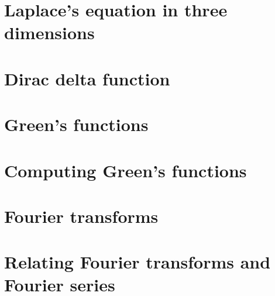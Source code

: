 \documentclass{article}
\begin{document}
\section{Laplace's equation in three dimensions}

\section{Dirac delta function}

\section{Green's functions}

\section{Computing Green's functions}

\section{Fourier transforms}

\section{Relating Fourier transforms and Fourier series}

\end{document}
